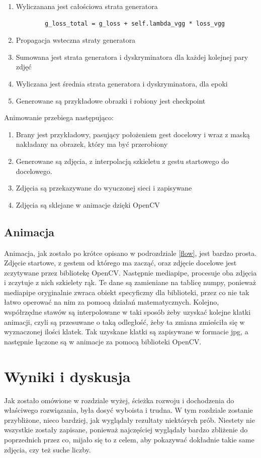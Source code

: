 \documentclass[12pt]{article}
\begin{document}
\begin{sloppypar}
{{\begin{enumerate}
      \item Wyliczanana jest całościowa strata generatora
      \begin{lstlisting}
        g_loss_total = g_loss + self.lambda_vgg * loss_vgg
      \end{lstlisting}
      \item Propagacja wsteczna straty generatora
      \item Sumowana jest strata generatora i dyskryminatora dla każdej kolejnej pary zdjęć
      \item Wyliczana jest średnia strata generatora i dyskryminatora, dla epoki
      \item Generowane są przykładowe obrazki i robiony jest checkpoint
    \end{enumerate}
    Animowanie przebiega następująco:
    \begin{enumerate}
      \item Brany jest przykładowy, pasujący położeniem gest docelowy i wraz z maską nakładany na obrazek, który ma być przerobiony
      \item Generowane są zdjęcia, z interpolacją szkieletu z gestu startowego do docelowego.
      \item Zdjęcia są przekazywane do wyuczonej sieci i zapisywane
      \item Zdjęcia są sklejane w animacje dzięki OpenCV
    \end{enumerate}
  }

  \subsection{Animacja}
  {
    Animacja, jak zostało po krótce opisano w podrozdziale \ref{flow}, jest bardzo prosta. 
    Zdjęcie startowe, z gestem od którego ma zacząć, oraz zdjęcie docelowe jest zczytywane przez bibliotekę OpenCV. 
    Następnie mediapipe, procesuje oba zdjęcia i zczytuje z nich szkielety rąk. 
    Te dane są zamieniane na tablicę numpy, ponieważ mediapipe oryginalnie zwraca obiekt specyficzny dla biblioteki, przez co nie tak łatwo operować na nim za pomocą działań matematycznych. 
    Kolejno, współrzędne stawów są interpolowane w taki sposób żeby uzyskać kolejne klatki animacji, czyli są przesuwane o taką odległość, żeby ta zmiana zmieściła się w wyznaczonej ilości klatek. 
    Tak uzyskane klatki są zapisywane w formacie jpg, a następnie łączone są w animacje za pomocą biblioteki OpenCV.
  }
}

\section{Wyniki i dyskusja}
{
  Jak zostało omówione w rozdziale wyżej, ścieżka rozwoju i dochodzenia do właściwego rozwiązania, była dosyć wyboista i trudna. 
  W tym rozdziale zostanie przybliżone, nieco bardziej, jak wyglądały rezultaty niektórych prób. 
  Niestety nie wszystkie zostały zapisane, ponieważ najczęściej wyglądały bardzo zbliżenie do poprzednich przez co, mijało się to z celem, aby pokazywać dokładnie takie same zdjęcia, czy też suche liczby.
}
\end{sloppypar}
\end{document}

